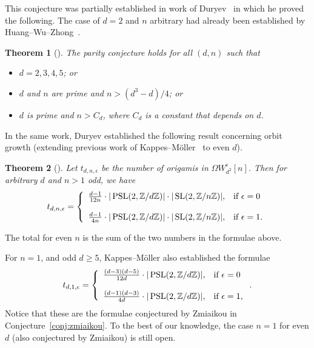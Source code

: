 \documentclass[a4paper,11pt]{amsart}
\numberwithin{equation}{section}
\numberwithin{figure}{section}
\numberwithin{table}{section}
\newtheorem{theorem}{Theorem}[section]
\newcommand{\Z}{\mathbb{Z}}
\DeclareMathOperator{\SL}{{\rm{SL}}}
\DeclareMathOperator{\PSL}{{\rm{PSL}}}
\begin{document}
This conjecture was partially established in work of Duryev~\cite{Dur} in which he proved the following. The case of $d = 2$ and $n$ arbitrary had already been established by Huang--Wu--Zhong~\cite{HWZ}.

\begin{theorem}[{\cite[Theorem 1.2]{Dur}}]\label{thm:Dur}
    The parity conjecture holds for all $(d,n)$ such that
    \begin{itemize}
        \item[(i)] $d = 2,3,4,5$; or
        \item[(ii)] $d$ and $n$ are prime and $n > (d^3-d)/4$; or
        \item[(iii)] $d$ is prime and $n> C_{d}$, where $C_{d}$ is a constant that depends on $d$.
    \end{itemize}
\end{theorem}

In the same work, Duryev established the following result concerning orbit growth (extending previous work of Kappes--M\"oller~\cite[Theorem 1.1]{KM} to even $d$).

\begin{theorem}[{\cite[Theorem 1.8]{Dur}}]
    Let $t_{d,n,\epsilon}$ be the number of origamis in $\Omega W_{d^2}^{\epsilon}[n]$. Then for arbitrary $d$ and $n>1$ odd, we have
    \[t_{d,n,\epsilon} = \left\lbrace\begin{array}{cl}
        \frac{d-1}{12n}\cdot|\PSL(2,\Z/d\Z)|\cdot|\SL(2,\Z/n\Z)|, & \text{if $\epsilon = 0$} \\
        \\
    \frac{d-1}{4n}\cdot|\PSL(2,\Z/d\Z)|\cdot|\SL(2,\Z/n\Z)|, & \text{if $\epsilon = 1$.}
    \end{array}\right.\]
\end{theorem}

The total for even $n$ is the sum of the two numbers in the formulae above.

For $n = 1$, and odd $d\geq 5$, Kappes--M\"oller also established the formulae
\[t_{d,1,\epsilon} = \left\lbrace\begin{array}{cl}
        \frac{(d-3)(d-5)}{12d}\cdot|\PSL(2,\Z/d\Z)|, & \text{if $\epsilon = 0$} \\
        \\
    \frac{(d-1)(d-3)}{4d}\cdot|\PSL(2,\Z/d\Z)|, & \text{if $\epsilon = 1$,}
    \end{array}\right..\]
Notice that these are the formulae conjectured by Zmiaikou in Conjecture~\ref{conj:zmiaikou}. To the best of our knowledge, the case $n = 1$ for even $d$ (also conjectured by Zmiaikou) is still open.
\end{document}

